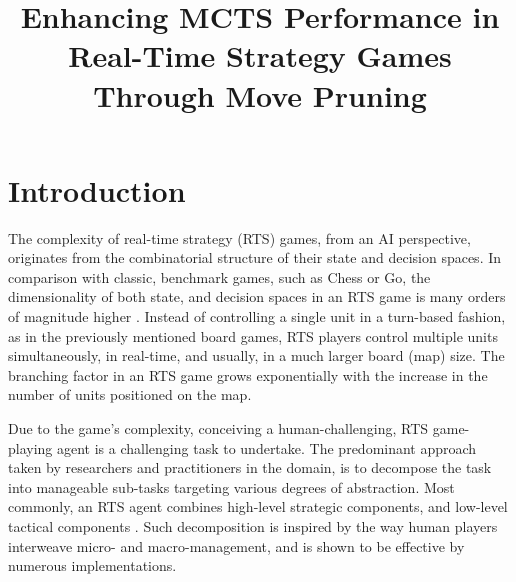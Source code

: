 \documentclass[conference]{IEEEtran}
\begin{document}
\title{Enhancing MCTS Performance in Real-Time Strategy Games Through Move Pruning}

\author{


}

\maketitle

\begin{abstract}

\end{abstract}

\begin{IEEEkeywords}

\end{IEEEkeywords}

\section{Introduction}

The complexity of real-time strategy (RTS) games, from an AI perspective, originates from the combinatorial structure of their state and decision spaces. In comparison with classic, benchmark games, such as Chess or Go, the dimensionality of both state, and decision spaces in an RTS game is many orders of magnitude higher \cite{ontanon_survey_2013}. Instead of controlling a single unit in a turn-based fashion, as in the previously mentioned board games, RTS players control multiple units simultaneously, in real-time, and usually, in a much larger board (map) size. The branching factor in an RTS game grows exponentially with the increase in the number of units positioned on the map.

Due to the game's complexity, conceiving a human-challenging, RTS game-playing agent is a challenging task to undertake. The predominant approach taken by researchers and practitioners in the domain, is to decompose the task into manageable sub-tasks targeting various degrees of abstraction. Most commonly, an RTS agent combines high-level strategic components, and low-level tactical components \cite{barriga_combining_2017}. Such decomposition is inspired by the way human players interweave micro- and macro-management, and is shown to be effective by numerous implementations.
\end{document}
